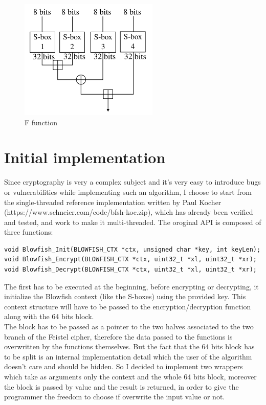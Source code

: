 \begin{figure}[H]
\centering
\includegraphics[scale = 0.6]{./Pictures/Blowfish_F_Function} %
\caption{F function}
\label{fig:F function}
\end{figure}

\section{Initial implementation}
Since cryptography is very a complex subject and it's very easy to introduce bugs or vulnerabilities while implementing such an algorithm, I choose to start from the single-threaded reference implementation written by Paul Kocher (https://www.schneier.com/code/bfsh-koc.zip), which has already been verified and tested, and work to make it multi-threaded.
The oroginal API is composed of three functions:

\begin{center}
\begin{lstlisting}
void Blowfish_Init(BLOWFISH_CTX *ctx, unsigned char *key, int keyLen);
void Blowfish_Encrypt(BLOWFISH_CTX *ctx, uint32_t *xl, uint32_t *xr);
void Blowfish_Decrypt(BLOWFISH_CTX *ctx, uint32_t *xl, uint32_t *xr);
\end{lstlisting}
\end{center}

The first has to be executed at the beginning, before encrypting or decrypting, it initialize the Blowfish context (like the S-boxes) using the provided key. This context structure will have to be passed to the encryption/decryption function along with the 64 bits block.\\
The block has to be passed as a pointer to the two halves associated to the two branch of the Feistel cipher, therefore the data passed to the functions is overwritten by the functions themselves. But the fact that the 64 bits block has to be split is an internal implementation detail which the user of the algorithm doesn't care and should be hidden. So I decided to implement two wrappers which take as arguments only the context and the whole 64 bits block, moreover the block is passed by value and the result is returned, in order to give the programmer the freedom to choose if overwrite the input value or not.

